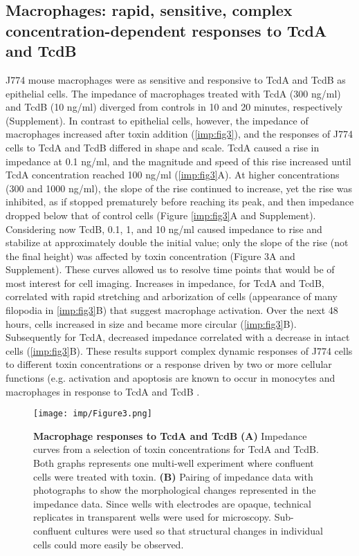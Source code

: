 \subsection{Macrophages: rapid, sensitive, complex concentration-dependent 
              responses to TcdA and TcdB}
J774 mouse macrophages were as sensitive and responsive to 
TcdA and TcdB as epithelial cells. The impedance of 
macrophages treated with TcdA (300 ng/ml) and TcdB (10 ng/ml) 
diverged from controls in 10 and 20 minutes, respectively 
(Supplement). In contrast to epithelial cells, however, the 
impedance of macrophages increased after toxin addition (\autoref{imp:fig3}), 
and the responses of J774 cells to TcdA and TcdB differed in 
shape and scale. TcdA caused a rise in impedance at 0.1 ng/ml, 
and the magnitude and speed of this rise increased until 
TcdA concentration reached 100 ng/ml (\autoref{imp:fig3}A). At 
higher concentrations (300 and 1000 ng/ml), the slope of 
the rise continued to increase, yet the rise was inhibited, 
as if stopped prematurely before reaching its peak, and 
then impedance dropped below that of control cells (Figure \autoref{imp:fig3}A
and Supplement). Considering now TcdB, 0.1, 1, and 10 ng/ml 
caused impedance to rise and stabilize at approximately double 
the initial value; only the slope of the rise (not the final 
height) was affected by toxin concentration (Figure 3A and 
Supplement). These curves allowed us to resolve time 
points that would be of most interest for cell imaging. 
Increases in impedance, for TcdA and TcdB, correlated 
with rapid stretching and arborization of cells (appearance 
of many filopodia in \autoref{imp:fig3}B) that suggest macrophage 
activation. Over the next 48 hours, cells increased in size 
and became more circular (\autoref{imp:fig3}B). Subsequently for TcdA, 
decreased impedance correlated with a decrease in intact 
cells (\autoref{imp:fig3}B). These results support complex 
dynamic responses of J774 cells to different toxin 
concentrations or a response driven by two or more 
cellular functions (e.g. activation and apoptosis are 
known to occur in monocytes and macrophages in response 
to TcdA and TcdB \cite{Solomon:2005dv,Siffert:1993ue,Linevsky:1997wt,MeloFilho:1997ws}.

\begin{figure}[h!]
  \centering
  \texttt{[image: imp/Figure3.png]}
  \caption[Macrophage responses to TcdA and TcdB]{
       \textbf{Macrophage responses to TcdA and TcdB}
       \textbf{(A)} Impedance curves from a selection of toxin 
       concentrations for TcdA and TcdB. Both graphs 
       represents one multi-well experiment where confluent 
       cells were treated with toxin. 
       \textbf{(B)} Pairing of impedance data with photographs 
       to show the morphological changes represented 
       in the impedance data. Since wells with electrodes 
       are opaque, technical replicates in transparent 
       wells were used for microscopy. Sub-confluent 
       cultures were used so that structural changes 
       in individual cells could more easily be observed.
  }
  \label{imp:fig3}
\end{figure}

